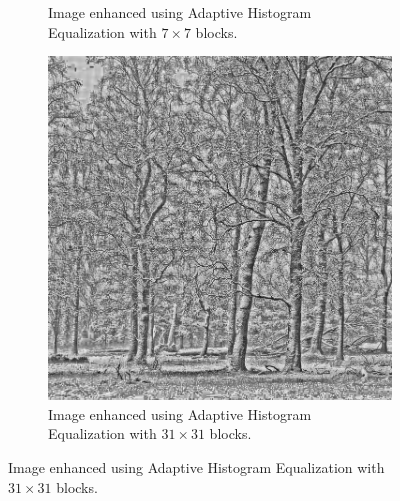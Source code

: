 \documentclass[a4paper, landscape]{article}
\begin{document}
\begin{figure}
\begin{subfigure}{0.32\linewidth}
        \caption{Image enhanced using Adaptive Histogram Equalization with $7\times 7$ blocks.}
    \end{subfigure}
    \begin{subfigure}{0.32\linewidth}
        \centering
        \includegraphics[height=0.4\textheight, keepaspectratio]{medium_enhanced_LC2.png}
        \caption{Image enhanced using Adaptive Histogram Equalization with $31\times 31$ blocks.}
    \end{subfigure}
\end{figure}
\end{document}
